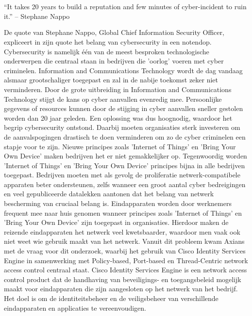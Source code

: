 
\chapter{}
\label{ch:inleiding}

\begin{displayquote}
	“It takes 20 years to build a reputation and few minutes of cyber-incident to ruin it.” – Stephane Nappo
\end{displayquote}

De quote van Stephane Nappo, Global Chief Information Security Officer, expliceert in zijn quote het belang van cybersecurity in een notendop. Cybersecurity is namelijk één van de meest besproken technologische onderwerpen die centraal staan in bedrijven die 'oorlog' voeren met cyber criminelen. Information and Communications Technology wordt de dag vandaag alsmaar grootschaliger toegepast en zal in de nabije toekomst zeker niet verminderen. Door de grote uitbreiding in Information and Communications Technology stijgt de kans op cyber aanvallen evenredig mee. Persoonlijke gegevens of resources kunnen door de stijging in cyber aanvallen sneller gestolen worden dan 20 jaar geleden. Een oplossing was dus hoognodig, waardoor het begrip cybersecurity ontstond. 
\newline
\newline
Daarbij moeten organisaties sterk investeren om de aanvalspogingen drastisch te doen verminderen om zo de cyber criminelen een stapje voor te zijn. Nieuwe principes zoals 'Internet of Things' en 'Bring Your Own Device' maken bedrijven het er niet gemakkelijker op. Tegenwoordig worden 'Internet of Things' en 'Bring Your Own Device' principes bijna in alle bedrijven toegepast. Bedrijven moeten met als gevolg de proliferatie netwerk-compatibele apparaten beter ondersteunen, zelfs wanneer een groot aantal cyber bedreigingen en veel gepubliceerde datalekken aantonen dat het belang van netwerk bescherming van cruciaal belang is. 
\newline
\newline
Eindapparaten worden door werknemers frequent mee naar huis genomen wanneer principes zoals 'Internet of Things' en 'Bring Your Own Device' zijn toegepast in organisaties. Hierdoor maken de reizende eindapparaten het netwerk veel kwetsbaarder, waardoor men vaak ook niet weet wie gebruik maakt van het netwerk. Vanuit dit probleem kwam Axians met de vraag voor dit onderzoek, waarbij het gebruik van Cisco Identity Services Engine in samenwerking met Policy-based, Port-based en Thread-Centric network access control centraal staat. Cisco Identity Services Engine is een network access control product dat de handhaving van beveiligings- en toegangsbeleid mogelijk maakt voor eindapparaten die zijn aangesloten op het netwerk van het bedrijf. Het doel is om de identiteitsbeheer en de veiligsbeheer van verschillende eindapparaten en applicaties te vereenvoudigen. 
